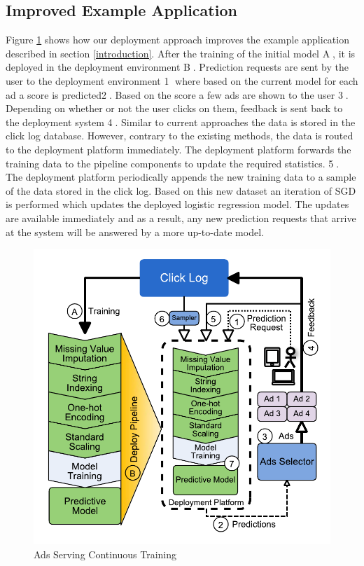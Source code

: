 \subsection{Improved Example Application}
Figure \ref{fig:improved-example} shows how our deployment approach improves the example application described in section \ref{introduction}.
After the training of the initial model \textcircled{A}, it is deployed in the deployment environment \textcircled{B}.
Prediction requests are sent by the user to the deployment environment \textcircled{1} where based on the current model for each ad a score is predicted\textcircled{2}.
Based on the score a few ads are shown to the user \textcircled{3}.
Depending on whether or not the user clicks on them, feedback is sent back to the deployment system \textcircled{4}.
Similar to current approaches the data is stored in the click log database.
However, contrary to the existing methods, the data is routed to the deployment platform immediately.
The deployment platform forwards the training data to the pipeline components to update the required statistics. \textcircled{5}.
The deployment platform periodically appends the new training data to a sample of the data stored in the click log.
Based on this new dataset an iteration of SGD is performed which updates the deployed logistic regression model.
The updates are available immediately and as a result, any new prediction requests that arrive at the system will be answered by a more up-to-date model.

\begin{figure}[t]
\centering
\includegraphics[width=\columnwidth]{../images/improved-example-vertical.pdf}
\caption{Ads Serving Continuous Training}
\label{fig:improved-example}
\end{figure}


